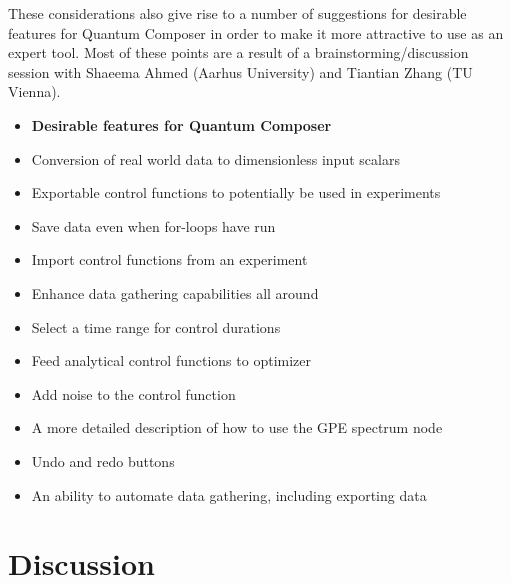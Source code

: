 \documentclass[a4paper, twocolumn]{revtex4-1}
\begin{document}
These considerations also give rise to a number of suggestions for desirable features for Quantum Composer in order to make it more attractive to use as an expert tool. Most of these points are a result of a brainstorming/discussion session with Shaeema Ahmed (Aarhus University) and Tiantian Zhang (TU Vienna).

\begin{itemize}
	\item[] \textbf{Desirable features for Quantum Composer} 
	\item Conversion of real world data to dimensionless input scalars
	\item Exportable control functions to potentially be used in experiments
	\item Save data even when for-loops have run
	\item Import control functions from an experiment
	\item Enhance data gathering capabilities all around
	\item Select a time range for control durations
	\item Feed analytical control functions to  optimizer
	\item Add noise to the control function
	\item A more detailed description of how to use the GPE spectrum node
	\item Undo and redo buttons
	\item An ability to automate data gathering, including exporting data
\end{itemize}

\section{Discussion}\label{sec:discussion}

\end{document}
